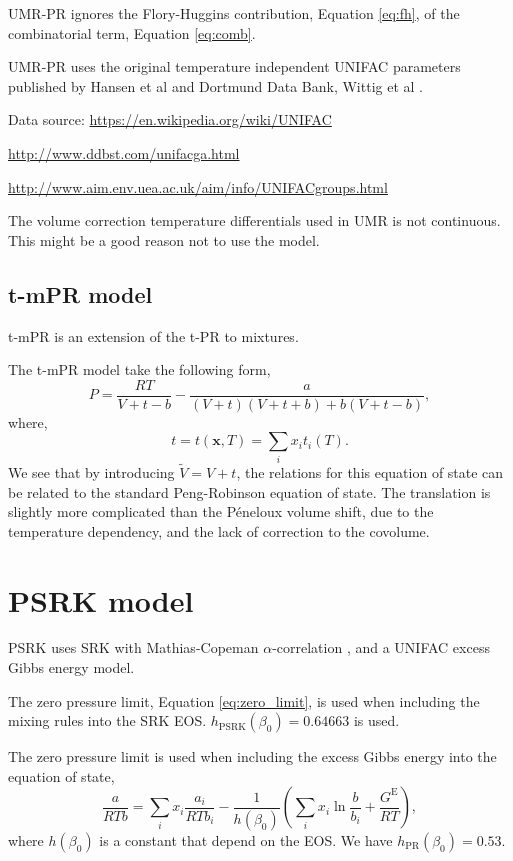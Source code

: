 \documentclass[english]{../thermomemo/thermomemo}
\newcommand*{\vektor}[1]{\boldsymbol{#1}}%
\newcommand{\excess}{\text{E}\xspace}
\begin{document}
UMR-PR ignores the Flory-Huggins contribution, Equation \ref{eq:fh},
of the combinatorial term, Equation \ref{eq:comb}.

UMR-PR uses the original temperature independent UNIFAC parameters published by Hansen et al \cite{Hansen1991} and Dortmund Data Bank, Wittig et al \cite{Wittig2003}.

Data source:
\url{https://en.wikipedia.org/wiki/UNIFAC}

\url{http://www.ddbst.com/unifacga.html}

\url{http://www.aim.env.uea.ac.uk/aim/info/UNIFACgroups.html}

The volume correction temperature differentials used in UMR is not
continuous. This might be a good reason not to use the model.


\subsection{t-mPR model}
t-mPR \cite{Avlonitis1994} is an extension of the t-PR
\cite{Magoulas1990} to mixtures.

The t-mPR model take the following form,
\begin{equation}
  \label{eq:t-mPR}
  P = \frac{RT}{V+t-b} - \frac{a}{(V+t)(V+t+b) + b(V+t-b)},
\end{equation}
where,
\begin{equation}
  \label{eq:tmix}
  t = t(\vektor{x},T) = \underset{i}{\sum} x_i t_i(T).
\end{equation}
We see that by introducing $\tilde{V} = V + t$, the relations for this
equation of state can be related to the standard Peng-Robinson
equation of state. The translation is slightly more complicated than
the P{\'e}neloux \cite{Peneloux1982} volume shift, due to the
temperature dependency, and the lack of correction to the covolume.

\section{PSRK model}
PSRK \cite{Holderbaum1991} uses SRK with Mathias-Copeman
$\alpha$-correlation \cite{Mathias1983}, and a UNIFAC excess Gibbs
energy model. 

The zero pressure limit, Equation \ref{eq:zero_limit},
is used when including the mixing rules into the SRK EOS.
$h_{\text{PSRK}}(\beta_0) = 0.64663$ is used.

The zero pressure limit is used when including the excess Gibbs energy into the equation of state,
\begin{equation}
  \label{eq:zero_limit}
  \frac{a}{RTb} = \underset{i}{\sum} x_i \frac{a_i}{RTb_i} - \frac{1}{h(\beta_0)}\left(\underset{i}{\sum} x_i \ln \frac{b}{b_i} + \frac{G^\excess}{RT} \right),
\end{equation}
where $h(\beta_0)$ is a constant that depend on the EOS. We have $h_{\text{PR}}(\beta_0) = 0.53$.
\end{document}
